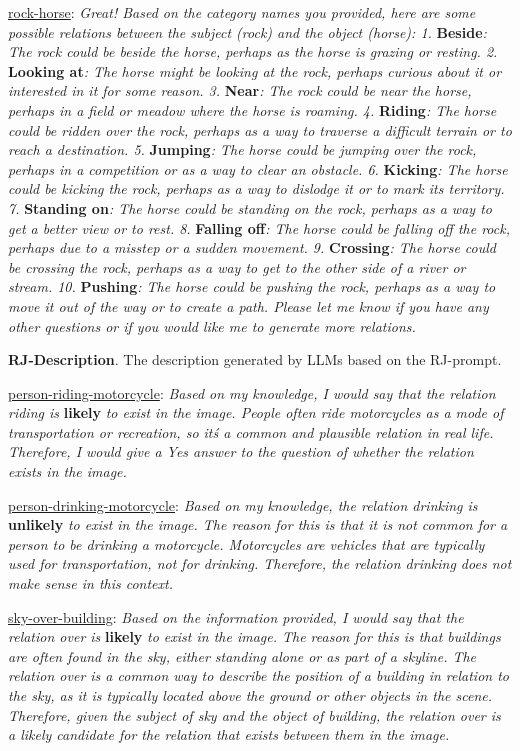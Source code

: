 \underline{rock-horse}: \textit{Great! Based on the category names you provided, here are some possible relations between the subject (rock) and the object (horse): 1.} \textbf{Beside}\textit{: The rock could be beside the horse, perhaps as the horse is grazing or resting. 2.} \textbf{Looking at}\textit{: The horse might be looking at the rock, perhaps curious about it or interested in it for some reason. 3.} \textbf{Near}\textit{: The rock could be near the horse, perhaps in a field or meadow where the horse is roaming. 4.} \textbf{Riding}\textit{: The horse could be ridden over the rock, perhaps as a way to traverse a difficult terrain or to reach a destination. 5.} \textbf{Jumping}\textit{: The horse could be jumping over the rock, perhaps in a competition or as a way to clear an obstacle. 6.} \textbf{Kicking}\textit{: The horse could be kicking the rock, perhaps as a way to dislodge it or to mark its territory. 7.} \textbf{Standing on}\textit{: The horse could be standing on the rock, perhaps as a way to get a better view or to rest. 8.} \textbf{Falling off}\textit{: The horse could be falling off the rock, perhaps due to a misstep or a sudden movement. 9.} \textbf{Crossing}\textit{: The horse could be crossing the rock, perhaps as a way to get to the other side of a river or stream. 10.} \textbf{Pushing}\textit{: The horse could be pushing the rock, perhaps as a way to move it out of the way or to create a path. Please let me know if you have any other questions or if you would like me to generate more relations.}

\noindent \textbf{RJ-Description}.
The description generated by LLMs based on the RJ-prompt.

\underline{person-riding-motorcycle}: \textit{Based on my knowledge, I would say that the relation riding is} \textbf{likely} \textit{to exist in the image. People often ride motorcycles as a mode of transportation or recreation, so it\'s a common and plausible relation in real life. Therefore, I would give a Yes answer to the question of whether the relation exists in the image.}

\underline{person-drinking-motorcycle}: \textit{Based on my knowledge, the relation drinking is} \textbf{unlikely} \textit{to exist in the image. The reason for this is that it is not common for a person to be drinking a motorcycle. Motorcycles are vehicles that are typically used for transportation, not for drinking. Therefore, the relation drinking does not make sense in this context.}

\underline{sky-over-building}: \textit{Based on the information provided, I would say that the relation over is} \textbf{likely} \textit{to exist in the image. The reason for this is that buildings are often found in the sky, either standing alone or as part of a skyline. The relation over is a common way to describe the position of a building in relation to the sky, as it is typically located above the ground or other objects in the scene. Therefore, given the subject of sky and the object of building, the relation over is a likely candidate for the relation that exists between them in the image.}

